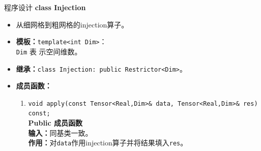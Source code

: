 \documentclass{beamer}
\begin{document}
\begin{frame}{程序设计}
\textbf{class Injection}
\begin{itemize}
    \item 从细网格到粗网格的injection算子。
    \item \textbf{模板：}\texttt{template<int Dim>}：\\\texttt{Dim} 表
      示空间维数。
      \item \textbf{继承：}\texttt{class Injection: public Restrictor<Dim>}。
    \item \textbf{成员函数：}
            \begin{enumerate}[(1)]
            \item \texttt{void apply(const Tensor<Real,Dim>\& data,
                Tensor<Real,Dim>\& res) const;}\\
                  \textbf{Public 成员函数}\\
                \textbf{输入：}同基类一致。\\
                \textbf{作用：}对\texttt{data}作用injection算子并将结果填入\texttt{res}。
            \end{enumerate}
\end{itemize}


\end{frame}
\end{document}
